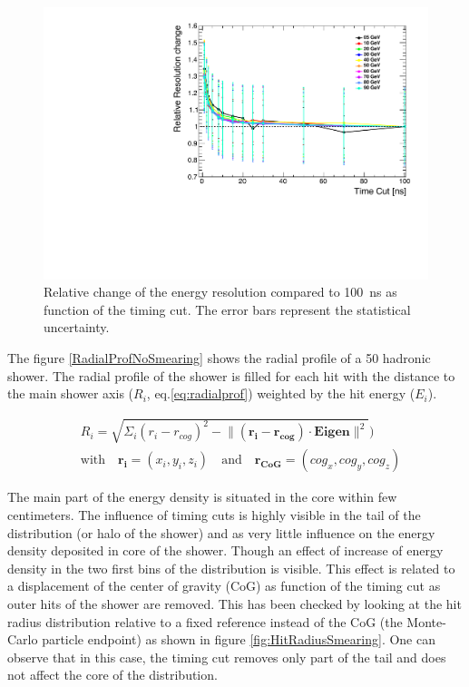\begin{figure}[htbp!]
  \centering
  \includegraphics[width=0.5\linewidth]{chap6/fig_TimingILD/NoSmearing/ShowerReso_TimeCuts_noSmearing}
  \caption{Relative change of the energy resolution compared to \SI{100}{\nano\second} as function of the timing cut. The error bars represent the statistical uncertainty.} \label{fig:resoRelativeNoSmearing}
\end{figure}

The figure \ref{RadialProfNoSmearing} shows the radial profile of a 50 \GeV hadronic shower. The radial profile of the shower is filled for each hit with the distance to the main shower axis ($R_{i}$, eq.\ref{eq:radialprof})  weighted by the hit energy ($E_{i}$).

\begin{equation} \label{eq:radialprof}
  \begin{split}
    & R_{i} = \sqrt{\Sigma_{i} (r_{i} - r_{cog})^{2} - \lVert (\mathbf{r_{i}} - \mathbf{r_{cog}}) \cdot \mathbf{Eigen} \rVert^{2}}) \\
    & \text{with} \quad \mathbf{r_{i}} = (x_i, y_i, z_i) \quad \text{and} \quad \mathbf{r_{CoG}} = (cog_x, cog_y, cog_z)
  \end{split}
\end{equation}

The main part of the energy density is situated in the core within few centimeters. The influence of timing cuts is highly visible in the tail of the distribution (or halo of the shower) and as very little influence on the energy density deposited in core of the shower. Though an effect of increase of energy density in the two first bins of the distribution is visible. This effect is related to a displacement of the center of gravity (CoG) as function of the timing cut as outer hits of the shower are removed. This has been checked by looking at the hit radius distribution relative to a fixed reference instead of the CoG (the Monte-Carlo particle endpoint) as shown in figure \ref{fig:HitRadiusSmearing}. One can observe that in this case, the timing cut removes only part of the tail and does not affect the core of the distribution.

